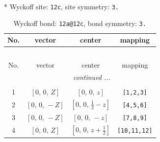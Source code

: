 \documentclass[fleqn,8pt]{jsarticle}
\begin{document}
* Wyckoff site: {\tt 12c}, site symmetry: {\tt 3.}
\renewcommand{\arraystretch}{1.2}
\begin{longtable}{cccc}
\caption{Wyckoff bond: {\tt 12a@12c}, bond symmetry: {\tt 3.}}
 \\
 \hline \hline
No. & vector & center & mapping \\ \hline \endfirsthead

\multicolumn{3}{l}{\tablename\ \thetable{}} \\
 \hline \hline
No. & vector & center & mapping \\ \hline \endhead

 \hline \hline
\multicolumn{3}{r}{\footnotesize\it continued ...} \\ \endfoot

 \hline \hline
\multicolumn{3}{r}{} \\ \endlastfoot

1 & $\left[ 0,\, 0,\, Z \right]$ & $\left[ 0,\, 0,\, z \right]$ & {\tt [1,2,3]} \\ \hline
2 & $\left[ 0,\, 0,\, - Z \right]$ & $\left[ 0,\, 0,\, \frac{1}{2} - z \right]$ & {\tt [4,5,6]} \\ \hline
3 & $\left[ 0,\, 0,\, - Z \right]$ & $\left[ 0,\, 0,\, - z \right]$ & {\tt [7,8,9]} \\ \hline
4 & $\left[ 0,\, 0,\, Z \right]$ & $\left[ 0,\, 0,\, z + \frac{1}{2} \right]$ & {\tt [10,11,12]} \\
\end{longtable}
\renewcommand{\arraystretch}{1.2}
\end{document}
